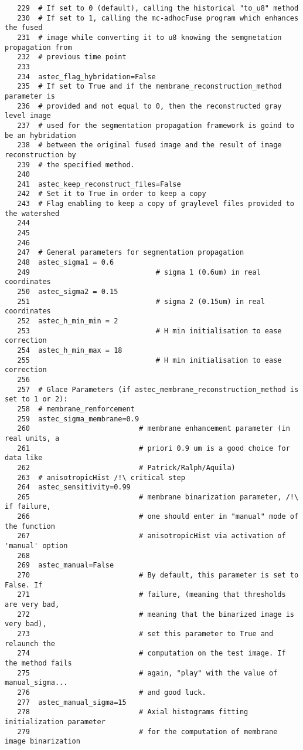 \begin{verbatim}
   229	# If set to 0 (default), calling the historical "to_u8" method
   230	# If set to 1, calling the mc-adhocFuse program which enhances the fused 
   231	# image while converting it to u8 knowing the semgnetation propagation from
   232	# previous time point
   233	
   234	astec_flag_hybridation=False
   235	# If set to True and if the membrane_reconstruction_method parameter is 
   236	# provided and not equal to 0, then the reconstructed gray level image
   237	# used for the segmentation propagation framework is goind to be an hybridation 
   238	# between the original fused image and the result of image reconstruction by
   239	# the specified method.
   240	
   241	astec_keep_reconstruct_files=False 
   242	# Set it to True in order to keep a copy
   243	# Flag enabling to keep a copy of graylevel files provided to the watershed
   244	
   245	
   246	
   247	# General parameters for segmentation propagation
   248	astec_sigma1 = 0.6  		
   249	                            # sigma 1 (0.6um) in real coordinates
   250	astec_sigma2 = 0.15 		
   251	                            # sigma 2 (0.15um) in real coordinates
   252	astec_h_min_min = 2    		
   253	                            # H min initialisation to ease correction
   254	astec_h_min_max = 18   		
   255	                            # H min initialisation to ease correction
   256	
   257	# Glace Parameters (if astec_membrane_reconstruction_method is set to 1 or 2):
   258	# membrane_renforcement
   259	astec_sigma_membrane=0.9
   260	                        # membrane enhancement parameter (in real units, a
   261							# priori 0.9 um is a good choice for data like 
   262							# Patrick/Ralph/Aquila)
   263	# anisotropicHist /!\ critical step
   264	astec_sensitivity=0.99  
   265	                        # membrane binarization parameter, /!\ if failure,
   266							# one should enter in "manual" mode of the function
   267							# anisotropicHist via activation of 'manual' option
   268	
   269	astec_manual=False     	
   270	                        # By default, this parameter is set to False. If 
   271							# failure, (meaning that thresholds are very bad, 
   272							# meaning that the binarized image is very bad),
   273					 		# set this parameter to True and relaunch the 
   274					 		# computation on the test image. If the method fails
   275					 		# again, "play" with the value of manual_sigma... 
   276					 		# and good luck.
   277	astec_manual_sigma=15   
   278	                        # Axial histograms fitting initialization parameter 
   279							# for the computation of membrane image binarization

\end{verbatim}
